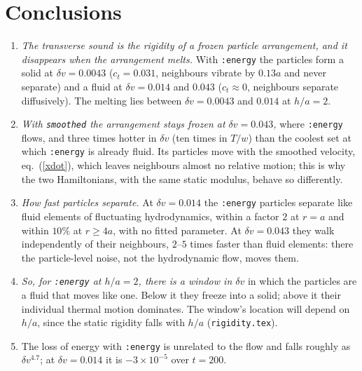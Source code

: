 \documentclass[11pt,aps,preprint,nofootinbib,superscriptaddress,tightenlines]{revtex4-2}
\def\Eq#1{eq.~(\ref{#1})}
\begin{document}
\section{Conclusions}
\label{sec:conclusions}

\begin{enumerate}
\item \emph{The transverse sound is the rigidity of a frozen particle arrangement, and it
  disappears when the arrangement melts.}  With \texttt{:energy} the particles form a solid at
  $\delta v=0.0043$ ($c_t=0.031$, neighbours vibrate by $0.13a$ and never separate) and a fluid at
  $\delta v=0.014$ and $0.043$ ($c_t\approx0$, neighbours separate diffusively).  The melting lies
  between $\delta v=0.0043$ and $0.014$ at $h/a=2$.
\item \emph{With \texttt{smoothed} the arrangement stays frozen at $\delta v=0.043$,} where
  \texttt{:energy} flows, and three times hotter in $\delta v$ (ten times in $T/w$) than the
  coolest set at which \texttt{:energy} is already fluid.
  Its particles move with the smoothed velocity, \Eq{xdot}, which leaves neighbours almost no
  relative motion; this is why the two Hamiltonians, with the same static modulus, behave so
  differently.
\item \emph{How fast particles separate.}  At $\delta v=0.014$ the \texttt{:energy} particles
  separate like fluid elements of fluctuating hydrodynamics, within a factor $2$ at $r=a$ and
  within $10\%$ at $r\ge4a$, with no fitted parameter.  At $\delta v=0.043$ they walk
  independently of their neighbours, $2$--$5$ times faster than fluid elements: there the
  particle-level noise, not the hydrodynamic flow, moves them.
\item \emph{So, for \texttt{:energy} at $h/a=2$, there is a window in $\delta v$} in which the
  particles are a fluid that moves like one.  Below it they freeze into a solid; above it
  their individual thermal motion dominates.  The window's location will depend on $h/a$,
  since the static rigidity falls with $h/a$ (\texttt{rigidity.tex}).
\item The loss of energy with \texttt{:energy} is unrelated to the flow and falls roughly as
  $\delta v^{4.7}$; at $\delta v=0.014$ it is $-3\times10^{-5}$ over $t=200$.
\end{enumerate}
\end{document}
